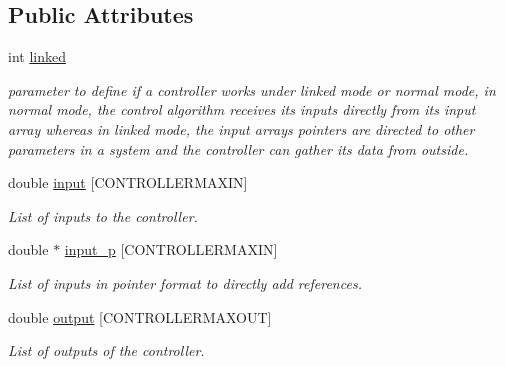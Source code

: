 \subsection*{Public Attributes}
\begin{DoxyCompactItemize}
\item 
\mbox{\label{struct_controller___af582cd0143eb90cf9009ba6c4692e70c}} 
int \hyperlink{struct_controller___af582cd0143eb90cf9009ba6c4692e70c}{linked}
\begin{DoxyCompactList}\small\item\em parameter to define if a controller works under linked mode or normal mode, in normal mode, the control algorithm receives its inputs directly from its input array whereas in linked mode, the input array\textquotesingle{}s pointers are directed to other parameters in a system and the controller can gather its data from outside. \end{DoxyCompactList}\item 
\mbox{\label{struct_controller___a0504cd8c3305e9111e111fea11ec2aa2}} 
double \hyperlink{struct_controller___a0504cd8c3305e9111e111fea11ec2aa2}{input} \mbox{[}C\+O\+N\+T\+R\+O\+L\+L\+E\+R\+M\+A\+X\+IN\mbox{]}
\begin{DoxyCompactList}\small\item\em List of inputs to the controller. \end{DoxyCompactList}\item 
\mbox{\label{struct_controller___a972e0c0df9ef11d202cdab559bd2c137}} 
double $\ast$ \hyperlink{struct_controller___a972e0c0df9ef11d202cdab559bd2c137}{input\+\_\+p} \mbox{[}C\+O\+N\+T\+R\+O\+L\+L\+E\+R\+M\+A\+X\+IN\mbox{]}
\begin{DoxyCompactList}\small\item\em List of inputs in pointer format to directly add references. \end{DoxyCompactList}\item 
\mbox{\label{struct_controller___a3be6b0f46af37ab6556d42ce6aa0e535}} 
double \hyperlink{struct_controller___a3be6b0f46af37ab6556d42ce6aa0e535}{output} \mbox{[}C\+O\+N\+T\+R\+O\+L\+L\+E\+R\+M\+A\+X\+O\+UT\mbox{]}
\begin{DoxyCompactList}\small\item\em List of outputs of the controller. \end{DoxyCompactList}\item 

\end{DoxyCompactItemize}
